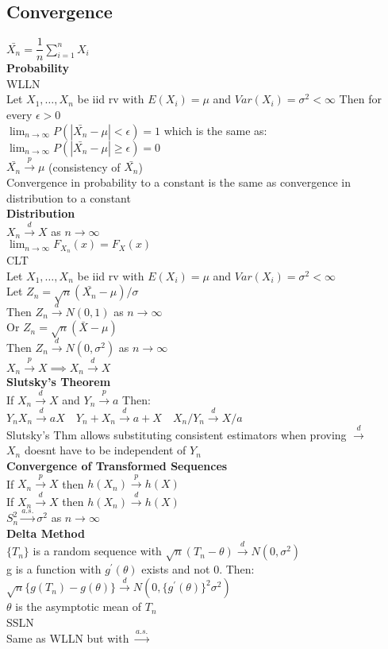 \documentclass{article}
\newcommand{\cd}{\overset{d}{\to}}
\newcommand{\cp}{\overset{p}{\to}}
\newcommand{\e}{\epsilon}
\newcommand{\limn}{\lim_{n\to \infty}}
\begin{document}
\begin{flushleft}
\section*{Convergence}
$\bar{X_n}=\dfrac{1}{n}\sum_{i=1}^{n}X_i$\\
\textbf{Probability}\\
WLLN\\
Let $X_1,\dots,X_n$ be iid rv with $E(X_i)=\mu$ and $Var(X_i)=\sigma^2<\infty$
Then for every $\e>0$\\
$\limn P(|\bar{X_n}-\mu|<\e)=1$ which is the same as:\\
$\limn P(|\bar{X_n}-\mu|\geq\e)=0$\\
$\bar{X_n}\cp \mu$ (consistency of $\bar{X_n}$)\\
Convergence in probability to a constant is the same as convergence in distribution to a constant\\
\textbf{Distribution}\\
$X_n\cd X$ as $n\to \infty$\\
$\limn F_{X_n}(x)=F_X(x)$\\
CLT\\
Let $X_1,\dots,X_n$ be iid rv with $E(X_i)=\mu$ and $Var(X_i)=\sigma^2<\infty$\\
Let $Z_n=\sqrt{n}(\bar{X_n}-\mu)/\sigma$\\
Then $Z_n \cd N(0,1)$ as $n\to \infty$\\
Or $Z_n=\sqrt{n}(\bar{X}-\mu)$\\
Then $Z_n \cd N(0,\sigma^2)$ as $n\to \infty$\\
$X_n\cp X \implies X_n \cd X$\\
\textbf{Slutsky's Theorem}\\
If $X_n\cd X$ and $Y_n \cp a$ Then:\\
$Y_nX_n\cd aX \quad Y_n+X_n \cd a+X \quad X_n/Y_n \cd X/a$\\
Slutsky's Thm allows substituting consistent estimators when proving $\cd$\\
$X_n$ doesnt have to be independent of $Y_n$\\
\textbf{Convergence of Transformed Sequences}\\
If $X_n \cp X$ then $h(X_n)\cp h(X)$\\
If $X_n \cd X$ then $h(X_n)\cd h(X)$\\
$S_n^2\overset{a.s.}{\to } \sigma^2$ as $n\to \infty$\\
\textbf{Delta Method}\\
$\{T_n\}$ is a random sequence with $\sqrt{n}(T_n-\theta)\cd N(0,\sigma^2)$\\
g is a function with $g^{'}(\theta)$ exists and not 0. Then:\\
$\sqrt{n}\{g(T_n)-g(\theta)\}\cd N(0,\{g^{'}(\theta)\}^2\sigma^2)$\\
$\theta$ is the asymptotic mean of $T_n$\\
SSLN\\
Same as WLLN but with $\overset{a.s.}{\to }$

\end{flushleft}
\end{document}
